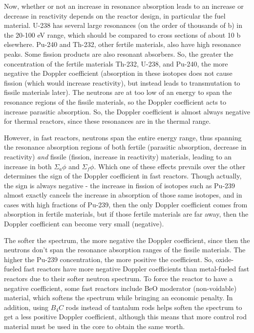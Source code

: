 \documentclass[10pt]{article}
\begin{document}
\begin{flushleft}
Now, whether or not an increase in resonance absorption leads to an increase or decrease in reactivity depends on the reactor design, in particular the fuel material. U-238 has several large resonances (on the order of thousands of b) in the 20-100 eV range, which should be compared to cross sections of about 10 b elsewhere. Pu-240 and Th-232, other fertile materials, also have high resonance peaks. Some fission products are also resonant absorbers. So, the greater the concentration of the fertile materials Th-232, U-238, and Pu-240, the more negative the Doppler coefficient (absorption in these isotopes does not cause fission (which would increase reactivity), but instead leads to transmutation to fissile materials later). The neutrons are at too low of an energy to span the resonance regions of the fissile materials, so the Doppler coefficient acts to increase parasitic absorption. So, the Doppler coefficient is almost always negative for thermal reactors, since these resonances are in the thermal range. 

However, in fast reactors, neutrons span the entire energy range, thus spanning the resonance absorption regions of both fertile (parasitic absorption, decrease in reactivity) \textit{and} fissile (fission, increase in reactivity) materials, leading to an increase in both \(\Sigma_a\phi\) and \(\Sigma_f\phi\). Which one of these effects prevails over the other determines the sign of the Doppler coefficient in fast reactors. Though actually, the sign is always negative - the increase in fission of isotopes such as Pu-239 almost exactly cancels the increase in absorption of those same isotopes, and in cases with high fractions of Pu-239, then the only Doppler coefficient comes from absorption in fertile materials, but if those fertile materials are far away, then the Doppler coefficient can become very small (negative). 

The softer the spectrum, the more negative the Doppler coefficient, since then the neutrons don't span the resonance absorption ranges of the fissile materials. The higher the Pu-239 concentration, the more positive the coefficient. So, oxide-fueled fast reactors have more negative Doppler coefficients than metal-fueled fast reactors due to their softer neutron spectrum. To force the reactor to have a negative coefficient, some fast reactors include BeO moderator (non-voidable) material, which softens the spectrum while bringing an economic penalty. In addition, using \(B_4C\) rods instead of tantalum rods helps soften the spectrum to get a less positive Doppler coefficient, although this means that more control rod material must be used in the core to obtain the same worth. 


\end{flushleft}
\end{document}
